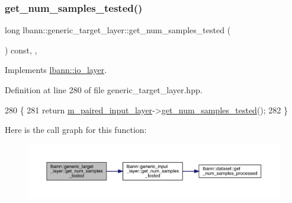 \subsubsection{\texorpdfstring{get\+\_\+num\+\_\+samples\+\_\+tested()}{get\_num\_samples\_tested()}}
{\footnotesize\ttfamily long lbann\+::generic\+\_\+target\+\_\+layer\+::get\+\_\+num\+\_\+samples\+\_\+tested (\begin{DoxyParamCaption}{ }\end{DoxyParamCaption}) const\hspace{0.3cm}{\ttfamily [inline]}, {\ttfamily [override]}, {\ttfamily [virtual]}}



Implements \hyperlink{classlbann_1_1io__layer_a2b2c9d3c1efce23840ef0c88ec566616}{lbann\+::io\+\_\+layer}.



Definition at line 280 of file generic\+\_\+target\+\_\+layer.\+hpp.


\begin{DoxyCode}
280                                                \{
281     \textcolor{keywordflow}{return} \hyperlink{classlbann_1_1generic__target__layer_a84da1260e9feb4fbc3e6f2315e4cab4b}{m\_paired\_input\_layer}->\hyperlink{classlbann_1_1generic__input__layer_a68b162bcc5fdfe2bb7279eb5d83cf884}{get\_num\_samples\_tested}();
282   \}
\end{DoxyCode}
Here is the call graph for this function\+:\nopagebreak
\begin{figure}[H]
\begin{center}
\leavevmode
\includegraphics[width=350pt]{classlbann_1_1generic__target__layer_a0187134110cd8a641e15f86e010b75a7_cgraph}
\end{center}
\end{figure}
\mbox{\label{classlbann_1_1generic__target__layer_abff09be96adbd480f35fcfba3c6cfc5a}} 
